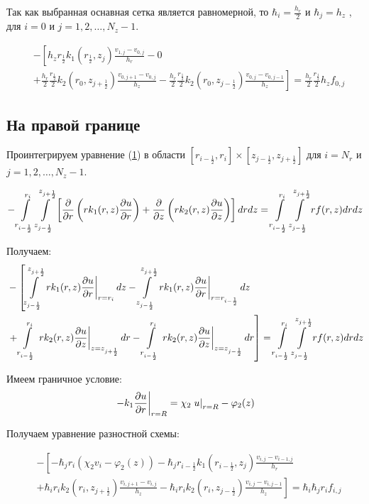 Так как выбранная оснавная сетка является равномерной, то $ \hbar_i = \frac{h_r}{2} $ и $ \hbar_j = h_z$
, для $ i = 0 $ и $ j = 1,2, \dots, N_z-1 $.

\begin{align*}
  &- \left [ 
    h_z r_{\frac{1}{2}} k_1(r_{\frac{1}{2}}, z_j) \frac{v_{1, j} - v_{0, j}}{h_{r}}
    - 0
    \right . \\
    &\left .
    + \frac{h_r}{2} \frac{r_{\frac{1}{2}}}{2} k_2(r_0, z_{j+\frac{1}{2}}) \frac{v_{0, j + 1} - v_{0, j}}{h_{z}}
    - \frac{h_r}{2} \frac{r_{\frac{1}{2}}}{2} k_2(r_0, z_{j-\frac{1}{2}}) \frac{v_{0, j} - v_{0, j - 1}}{h_z}
    \right ]  = \frac{h_r}{2} \frac{r_{\frac{1}{2}}}{2} h_z f_{0, j}
\end{align*}

\subsection{На правой границе}
Проинтегрируем уравнение (\hyperref[eq1]{1}) в области
$ [r_{i -\frac{1}{2}}, r_{i}] \times  [z_{j -\frac{1}{2}}, z_{j +\frac{1}{2}}] $
для $ i = N_r $ и $ j = 1, 2, \dots, N_z - 1$.

\[
  - \mLim{}{-\frac{1}{2}}{+\frac{1}{2}}{-\frac{1}{2}} \left [ \pdv{}{r} \left ( r k_1(r, z) \pdv{u}{r} \right ) 
  + \pdv{}{z} \left ( rk_2(r, z)\pdv{u}{z} \right ) \right ]dr dz = \mLim{}{-\frac{1}{2}}{+\frac{1}{2}}{-\frac{1}{2}} rf(r, z)dr dz
\]

Получаем:
\begin{align*}
  &- \left [
   \mLimZ{z}{+\frac{1}{2}}{-\frac{1}{2}}{j}  \left . r k_1(r, z) \pdv{u}{r} \right \vert_{r = r_{i}} dz
  - \mLimZ{z}{+\frac{1}{2}}{-\frac{1}{2}}{j} \left . r k_1(r, z) \pdv{u}{r} \right \vert_{r = r_{i - \frac{1}{2}}} dz
  \right . \\
  &\left . + \mLimS{r}{}{-\frac{1}{2}} \left . rk_2(r, z)\pdv{u}{z} \right \vert_{z = z_{j + \frac{1}{2}}} dr
  - \mLimS{r}{}{-\frac{1}{2}} \left . rk_2(r, z)\pdv{u}{z} \right \vert_{z = z_{j - \frac{1}{2}}} dr
  \right ] = \mLim{}{-\frac{1}{2}}{+\frac{1}{2}}{-\frac{1}{2}} rf(r, z) dr dz
\end{align*}

Имеем граничное условие:
\[
  \left . -k_1 \pdv{u}{r} \right \vert_{r=R} = \chi_2 \left . u \right \vert_{r=R} - \varphi_2(z)
\]

Получаем уравнение разностной схемы:

\begin{align*}
  &- \left [ 
  -\hbar_j r_i ( \chi_2 v_i - \varphi_2(z))
  - \hbar_j r_{i-\frac{1}{2}} k_1(r_{i-\frac{1}{2}}, z_j) \frac{v_{i, j} - v_{i - 1, j}}{h_{r}}
  \right . \\
  &\left .
  + \hbar_i r_{i} k_2(r_i, z_{j+\frac{1}{2}}) \frac{v_{i, j + 1} - v_{i, j}}{h_{z}}
  - \hbar_i r_{i} k_2(r_i, z_{j-\frac{1}{2}}) \frac{v_{i, j} - v_{i, j - 1}}{h_z}
  \right ]  = \hbar_i \hbar_j r_i f_{i, j}
\end{align*}


